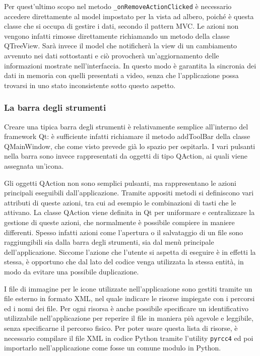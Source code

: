 \documentclass[12pt]{toptesi}
\begin{document}
Per quest'ultimo scopo nel metodo \verb|_onRemoveActionClicked| è necessario accedere direttamente al model impostato per la vista ad albero, poiché è questa classe che si occupa di gestire i dati, secondo il pattern MVC. Le azioni non vengono infatti rimosse direttamente richiamando un metodo della classe QTreeView. Sarà invece il model che notificherà la view di un cambiamento avvenuto nei dati sottostanti e ciò provocherà un'aggiornamento delle informazioni mostrate nell'interfaccia. In questo modo è garantita la sincronia dei dati in memoria con quelli presentati a video, senza che l'applicazione possa trovarsi in uno stato inconsistente sotto questo aspetto.

\subsubsection{La barra degli strumenti}

Creare una tipica barra degli strumenti è relativamente semplice all'interno del framework Qt: è sufficiente infatti richiamare il metodo addToolBar della classe QMainWindow, che come visto prevede già lo spazio per ospitarla. I vari pulsanti nella barra sono invece rappresentati da oggetti di tipo QAction, ai quali viene assegnata un'icona. 

Gli oggetti QAction non sono semplici pulsanti, ma rappresentano le azioni principali eseguibili dall'applicazione. Tramite appositi metodi si definiscono vari attributi di queste azioni, tra cui ad esempio le combinazioni di tasti che le attivano. La classe QAction viene definita in Qt per uniformare e centralizzare la gestione di queste azioni, che normalmente è possibile compiere in maniere differenti. Spesso infatti azioni come l'apertura o il salvataggio di un file sono raggiungibili sia dalla barra degli strumenti, sia dal menù principale dell'applicazione. Siccome l'azione che l'utente si aspetta di eseguire è in effetti la stessa, è opportuno che dal lato del codice venga utilizzata la stessa entità, in modo da evitare una possibile duplicazione.

I file di immagine per le icone utilizzate nell'applicazione sono gestiti tramite un file esterno in formato XML, nel quale indicare le risorse impiegate con i percorsi ed i nomi dei file. Per ogni risorsa è anche possibile specificare un identificativo utilizzabile nell'applicazione per reperire il file in maniera più agevole e leggibile, senza specificarne il percorso fisico. Per poter usare questa lista di risorse, è necessario compilare il file XML in codice Python tramite l'utility \verb|pyrcc4| ed poi importarlo nell'applicazione come fosse un comune modulo in Python.
\end{document}

